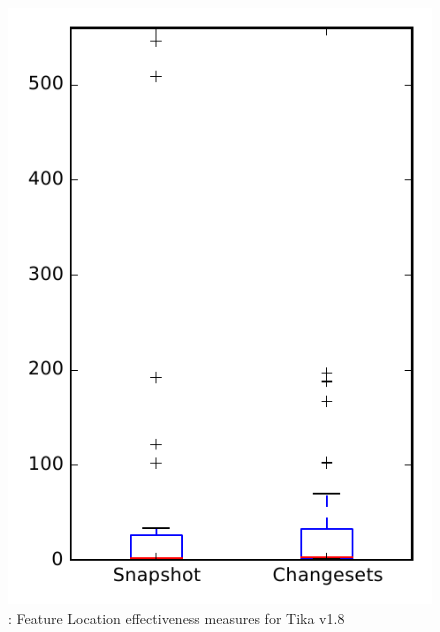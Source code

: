
\begin{figure}
\centering
\includegraphics[height=0.4\textheight]{figures/flt/rq1_tika}
\caption{\fone: Feature Location effectiveness measures for Tika v1.8}
\label{fig:flt:rq1:tika}
\end{figure}
